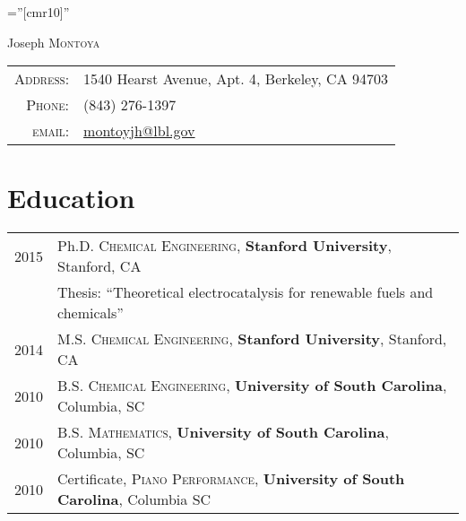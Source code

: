 \documentclass[a4paper,10pt]{article}
\begin{document}

\pagestyle{empty} %

\font\fb=''[cmr10]'' %

\par{\centering
		{\Huge Joseph \textsc{Montoya}
	}\bigskip\par}


\begin{tabular}{rl}
    \textsc{Address:}   & 1540 Hearst Avenue, Apt. 4, Berkeley, CA  94703 \\
    \textsc{Phone:}     & (843) 276-1397\\
    \textsc{email:}     & \href{mailto:montoyjh@lbl.gov}{montoyjh@lbl.gov}
\end{tabular}

\section{Education}
\begin{tabular}{ll}	
2015 & Ph.D. \textsc{Chemical Engineering}, \textbf{Stanford University}, Stanford, CA\\
& Thesis: ``Theoretical electrocatalysis for renewable fuels and chemicals'' \vspace{0.1in} \\
2014 & M.S. \textsc{Chemical Engineering}, \textbf{Stanford University}, Stanford, CA \vspace{0.1in} \\
2010 & B.S. \textsc{Chemical Engineering}, \textbf{University of South Carolina}, Columbia, SC\\
2010 & B.S. \textsc{Mathematics}, \textbf{University of South Carolina}, Columbia, SC\\
2010 & Certificate, \textsc{Piano Performance}, \textbf{University of South Carolina}, Columbia SC
\end{tabular}
\vspace{0.2in}
\end{document}
